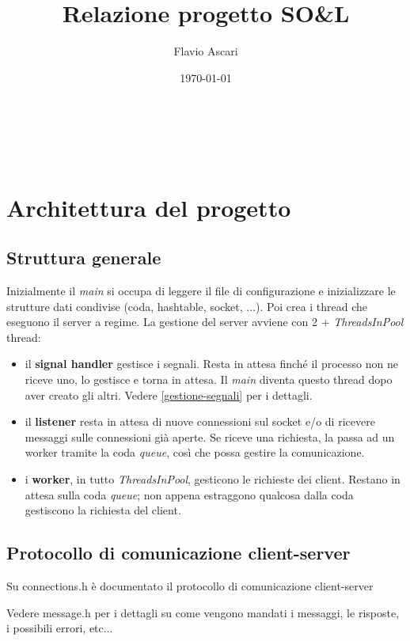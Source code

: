 \documentclass[a4paper]{article}
\title{Relazione progetto SO\&L}\let\Title\@title
\author{Flavio Ascari}\let\Author\@author
\date{\today}\let\Date\@date
\theoremstyle{theorem}
\theoremstyle{remark}
\theoremstyle{definition}
\theoremstyle{corollary}
\theoremstyle{lemma}
\newcommand\codeName[1]{%
	\textit{#1}}
\begin{document}
\begin{center}
	\vspace*{0,5 cm}
	{\Huge \textsc{\Title}} \\
	\vspace{0,5 cm}
	\textsc{\Author} \
	\textsc{\Date}
	\thispagestyle{empty}
	\vspace{0,7 cm}
\end{center}
\small

\tableofcontents
\clearpage




\section{Architettura del progetto}
\subsection{Struttura generale}
Inizialmente il \codeName{main} si occupa di leggere il file di configurazione e inizializzare le strutture dati condivise (coda, hashtable, socket, ...). Poi crea i thread che eseguono il server a regime.
La gestione del server avviene con 2 + \codeName{ThreadsInPool} thread:
\begin{itemize}
	\item il \textbf{signal handler} gestisce i segnali. Resta in attesa finché il processo non ne riceve uno, lo gestisce e torna in attesa. Il \codeName{main} diventa questo thread dopo aver creato gli altri. Vedere \autoref{gestione-segnali} per i dettagli.
	\item il \textbf{listener} resta in attesa di nuove connessioni sul socket e/o di ricevere messaggi sulle connessioni già aperte. Se riceve una richiesta, la passa ad un worker tramite la coda \codeName{queue}, così che possa gestire la comunicazione.
	\item i \textbf{worker}, in tutto \codeName{ThreadsInPool}, gesticono le richieste dei client. Restano in attesa sulla coda \codeName{queue}; non appena estraggono qualcosa dalla coda gestiscono la richiesta del client.
\end{itemize}


\subsection{Protocollo di comunicazione client-server}
Su connections.h è documentato il protocollo di comunicazione client-server

Vedere message.h per i dettagli su come vengono mandati i messaggi, le risposte,
i possibili errori, etc...
\end{document}
